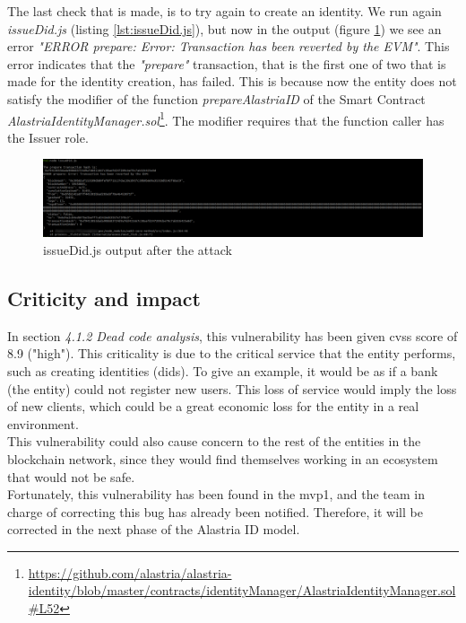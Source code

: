 \documentclass[a4paper, 12pt]{article} %
\begin{document}
        The last check that is made, is to try again to create an identity. We run again \textit{issueDid.js} (listing \ref{lst:issueDid.js}), but now in the output (figure \ref{fig:poc-5}) we see an error \textit{"ERROR prepare: Error: Transaction has been reverted by the EVM"}. This error indicates that the \textit{"prepare"} transaction, that is the first one of two that is made for the identity creation, has failed. This is because now the entity does not satisfy the modifier of the function \textit{prepareAlastriaID} of the Smart Contract \textit{AlastriaIdentityManager.sol}\footnote{\url{https://github.com/alastria/alastria-identity/blob/master/contracts/identityManager/AlastriaIdentityManager.sol\#L52}}. The modifier requires that the function caller has the Issuer role.
        \begin{figure}[h]
            \centering
            \includegraphics[width=1.0\textwidth]{poc/5.png}
            \caption{issueDid.js output after the attack}
            \label{fig:poc-5}
        \end{figure}
        
    \subsection{Criticity and impact}
        In section \textit{4.1.2 Dead code analysis}, this vulnerability has been given \acrshort{cvss} score of 8.9 ("high"). This criticality is due to the critical service that the entity performs, such as creating identities (\acrshort{did}s). To give an example, it would be as if a bank (the entity) could not register new users. This loss of service would imply the loss of new clients, which could be a great economic loss for the entity in a real environment.\\

        This vulnerability could also cause concern to the rest of the entities in the blockchain network, since they would find themselves working in an ecosystem that would not be safe.\\
        
        Fortunately, this vulnerability has been found in the \acrshort{mvp}1, and the team in charge of correcting this bug has already been notified. Therefore, it will be corrected in the next phase of the Alastria ID model.\\
        
\end{document}
